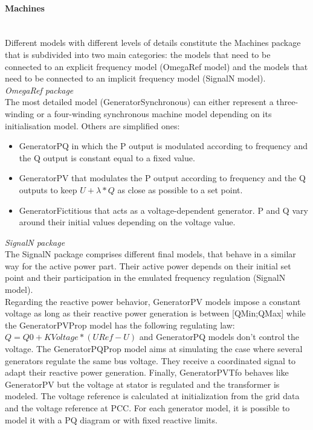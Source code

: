 \documentclass[a4paper, 12pt]{report}
\begin{document}
\paragraph{Machines}
~~\\

Different models with different levels of details constitute the Machines package that is subdivided into two main categories: the models that need to be connected to an explicit frequency model (OmegaRef model) and the models that need to be connected to an implicit frequency model (SignalN model). \\

\textit{OmegaRef package} \\

The most detailed model (GeneratorSynchronous) can either represent a three-winding or a four-winding synchronous machine model depending on its initialisation model. Others are simplified ones:
\begin{itemize}
\item GeneratorPQ in which the P output is modulated according to frequency and the Q output is constant equal to a fixed value.
\item GeneratorPV that modulates the P output according to frequency and the Q outputs to keep $U + \lambda * Q$ as close as possible to a set point.
\item GeneratorFictitious that acts as a voltage-dependent generator. P and Q vary around their initial values depending on the voltage value.
\end{itemize}
\medskip

\textit{SignalN package} \\

The SignalN package comprises different final models, that behave in a similar way for the active power part. Their active power depends on their initial set point and their participation in the emulated frequency regulation (SignalN model). \\
Regarding the reactive power behavior, GeneratorPV models impose a constant voltage as long as their reactive power generation is between [QMin;QMax] while the GeneratorPVProp model has the following regulating law: $Q = Q0 + KVoltage * (URef - U)$ and GeneratorPQ models don't control the voltage. The GeneratorPQProp model aims at simulating the case where several generators regulate the same bus voltage. They receive a coordinated signal to adapt their reactive power generation. Finally, GeneratorPVTfo behaves like GeneratorPV but the voltage at stator is regulated and the transformer is modeled. The voltage reference is calculated at initialization from the grid data and the voltage reference at PCC. For each generator model, it is possible to model it with a PQ diagram or with fixed reactive limits.
\end{document}
